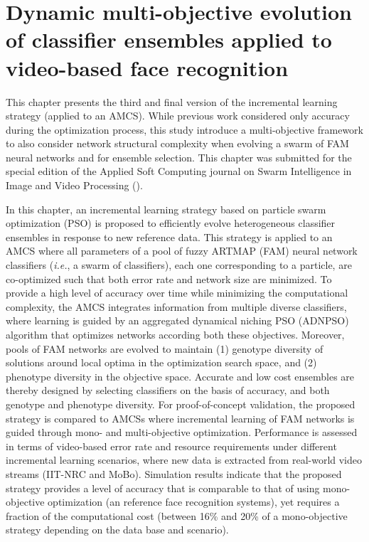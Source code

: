 \chapter{Dynamic multi-objective evolution of classifier ensembles applied to video-based face recognition}

This chapter presents the third and final version of the incremental learning strategy (applied to an AMCS).
While previous work considered only accuracy during the optimization process, this study introduce a multi-objective framework to also consider network structural complexity when evolving a swarm of FAM neural networks and for ensemble selection.
This chapter was submitted for the special edition of the Applied Soft Computing journal on Swarm Intelligence in Image and Video Processing (\cite{connolly12}).

In this chapter, an incremental learning strategy based on particle swarm optimization (PSO) is proposed to efficiently evolve heterogeneous classifier ensembles in response to new reference data.  This strategy is applied to an AMCS where all parameters of a pool of fuzzy ARTMAP (FAM) neural network classifiers  (\emph{i.e.}, a swarm of classifiers), each one corresponding to a particle, are co-optimized such that both error rate and network size are minimized.
To provide a high level of accuracy over time while minimizing the computational complexity, the AMCS integrates information from multiple diverse classifiers, where learning is guided by an aggregated dynamical niching PSO (ADNPSO) algorithm that optimizes networks according both these objectives.
Moreover, pools of FAM networks are evolved to maintain (1) genotype diversity of solutions around local optima in the optimization search space, and (2) phenotype diversity in the objective space.
Accurate and low cost ensembles are thereby designed by selecting classifiers on the basis of accuracy, and both genotype and phenotype diversity. For proof-of-concept validation, the proposed strategy is compared to AMCSs  where incremental learning of FAM networks is guided through mono- and multi-objective optimization.
Performance is assessed in terms of video-based error rate and resource requirements under different incremental learning scenarios, where new data is extracted from real-world video streams (IIT-NRC and MoBo).
Simulation results indicate that the proposed strategy provides a level of accuracy that is comparable to that of using mono-objective optimization (an reference face recognition systems), yet requires a fraction of the computational cost (between 16\% and 20\% of a mono-objective strategy depending on the data base and scenario).

